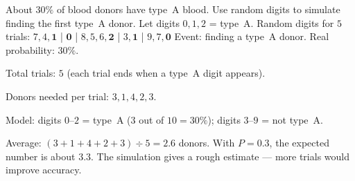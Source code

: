 \begin{stepExample}{About $30\%$ of blood donors have type~A blood. Use random digits to simulate finding the first type~A donor. Let digits $0, 1, 2$ = type~A. Random digits for $5$ trials:
$7, 4, \mathbf{1}$ \; | \; $\mathbf{0}$ \; | \; $8, 5, 6, \mathbf{2}$ \; | \; $3, \mathbf{1}$ \; | \; $9, 7, \mathbf{0}$}
     Event: finding a type~A donor. Real probability: $30\%$.

     Total trials: $5$ (each trial ends when a type~A digit appears).

     Donors needed per trial: $3, 1, 4, 2, 3$.

     Model: digits $0$--$2$ = type~A ($3$ out of $10 = 30\%$); digits $3$--$9$ = not type~A.

     Average: $(3 + 1 + 4 + 2 + 3) \div 5 = 2.6$ donors. With $P = 0.3$, the expected number is about $3.3$. The simulation gives a rough estimate --- more trials would improve accuracy.
\end{stepExample}


